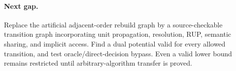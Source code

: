 \documentclass{article}
\begin{document}
\paragraph{Next gap.} Replace the artificial adjacent-order rebuild graph by a source-checkable transition graph incorporating unit propagation, resolution, RUP, semantic sharing, and implicit access. Find a dual potential valid for every allowed transition, and test oracle/direct-decision bypass. Even a valid lower bound remains restricted until arbitrary-algorithm transfer is proved.
\end{document}
